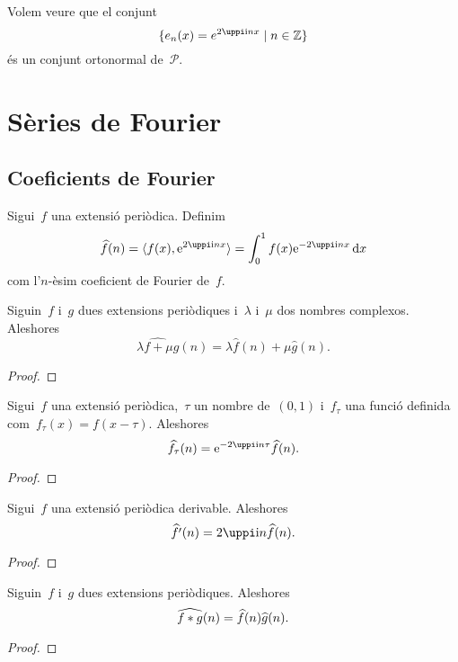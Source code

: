 \documentclass[../../Main.tex]{subfiles}
\begin{document}
	\begin{example}
		\label{ex:base ortonormal de les extensions periòdiques}
		Volem veure que el conjunt
		\[
		    \{e_{n}(x)=e^{2\uppi\iu nx}\mid n\in\mathbb{Z}\}
		\]
		és un conjunt ortonormal de~\(\mathcal{P}\).
		\begin{solution}
		\end{solution}
	\end{example}
\section{Sèries de Fourier}
	\subsection{Coeficients de Fourier}
	\begin{definition}
		\label{def:coeficients de Fourier}
		Sigui~\(f\) una extensió periòdica.
		Definim
		\[
		    \widehat{f}(n)=\langle f(x),\e^{2\uppi\iu nx}\rangle=\int_{0}^{1}f(x)\e^{-2\uppi\iu nx}\diff x
		\]
		com l'\(n\)-èsim coeficient de Fourier de~\(f\).
	\end{definition}
	\begin{proposition}
		Siguin~\(f\) i~\(g\) dues extensions periòdiques i~\(\lambda\) i~\(\mu\) dos nombres complexos.
		Aleshores
		\[
		    \widehat{\lambda f+\mu g}(n)=\lambda\widehat{f}(n)+\mu\widehat{g}(n).
		\]
		\begin{proof}
		\end{proof}
	\end{proposition}
	\begin{proposition}
		Sigui~\(f\) una extensió periòdica,~\(\tau\) un nombre de~\((0,1)\) i~\(f_{\tau}\) una funció definida com~\(f_{\tau}(x)=f(x-\tau)\).
		Aleshores
		\[
		    \widehat{f_{\tau}}(n)=\e^{-2\uppi\iu n\tau}\widehat{f}(n).
		\]
		\begin{proof}
		\end{proof}
	\end{proposition}
	\begin{proposition}
		Sigui~\(f\) una extensió periòdica derivable.
		Aleshores
		\[
		    \widehat{f'}(n)=2\uppi\iu n\widehat{f}(n).
		\]
		\begin{proof}
		\end{proof}
	\end{proposition}
	\begin{proposition}
		Siguin~\(f\) i~\(g\) dues extensions periòdiques.
		Aleshores
		\[
		    \widehat{f\mathbin{\ast} g}(n)=\widehat{f}(n)\widehat{g}(n).
		\]
		\begin{proof}
		\end{proof}
	\end{proposition}
\end{document}
